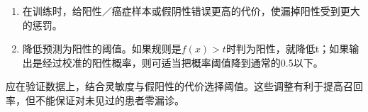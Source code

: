 
\begin{enumerate}[start=1]

\item 在训练时，给阳性／癌症样本或假阴性错误更高的代价，使漏掉阳性受到更大的惩罚。

\item 降低预测为阳性的阈值。如果规则是\(f(x)>t\)时判为阳性，就降低t；如果输出是经过校准的阳性概率，则可适当把概率阈值降到通常的0.5以下。

\end{enumerate}


应在验证数据上，结合灵敏度与假阳性的代价选择阈值。这些调整有利于提高召回率，但不能保证对未见过的患者零漏诊。
